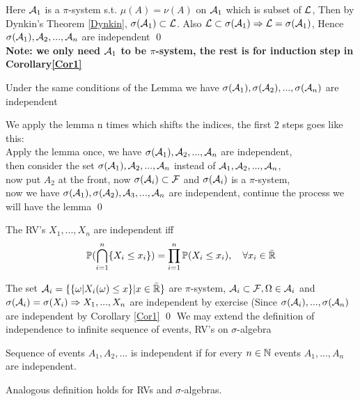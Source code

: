 Here $\mathcal{A}_1$ is a $\pi$-system s.t. $\mu(A) = \nu(A)$ on $\mathcal{A}_1$ which is subset of $\mathcal{L}$, Then by Dynkin's Theorem \ref{Dynkin}, $\sigma(\mathcal{A}_1) \subset \mathcal{L}$. Also $\mathcal{L} \subset \sigma(\mathcal{A}_1) \Rightarrow \mathcal{L} = \sigma(\mathcal{A}_1)$, Hence $\sigma(\mathcal{A}_1), \mathcal{A}_2, ..., \mathcal{A}_n$ are independent \qed \\[0.5cm]
\textbf{Note: we only need $\mathcal{A}_1$ to be $\pi$-system, the rest is for induction step in Corollary\ref{Cor1}}
\newpage
\begin{cor}\label{Cor1}
Under the same conditions of the Lemma we have $\sigma(\mathcal{A}_1), \sigma(\mathcal{A}_2), ..., \sigma(\mathcal{A}_n)$ are independent
\end{cor}
\pf We apply the lemma n times which shifts the indices, the first 2 steps goes like this: \\
Apply the lemma once, we have $\sigma(\mathcal{A}_1), \mathcal{A}_2, ..., \mathcal{A}_n$ are independent, \\
then consider the set $\sigma(\mathcal{A}_1), \mathcal{A}_2, ..., \mathcal{A}_n$ instead of $\mathcal{A}_1, \mathcal{A}_2, ..., \mathcal{A}_n$, \\
now put $A_2$ at the front, now $\sigma(\mathcal{A}_i) \subset \mathcal{F}$ and $\sigma(\mathcal{A}_i)$ is a $\pi$-system, \\
now we have $\sigma(\mathcal{A}_1), \sigma(\mathcal{A}_2), \mathcal{A}_3, ..., \mathcal{A}_n$ are independent, continue the process we will have the lemma \qed
\begin{cor}
The RV's $X_1, ..., X_n$ are independent iff
\begin{equation*}
    \mathbb{P}(\bigcap\limits_{i=1}^n \{X_i \leq x_i\}) = \prod\limits_{i=1}^n \mathbb{P}(X_i \leq x_i), \quad \forall x_i \in \bar{\mathbb{R}}
\end{equation*}
\end{cor}
\pf The set $\mathcal{A}_i = \{\{\omega| X_i(\omega)\leq x\}|x\in \bar{\mathbb{R}}\}$ are $\pi$-system, $\mathcal{A}_i\subset \mathcal{F}, \Omega \in \mathcal{A}_i$ and $\sigma(\mathcal{A}_i) = \sigma(X_i) \Rightarrow X_1,...,X_n$ are independent by exercise (Since $\sigma(\mathcal{A}_i),...,\sigma(\mathcal{A}_n)$ are independent by Corollary \ref{Cor1} \qed 
\newpage
We may extend the definition of independence to infinite sequence of events, RV's on $\sigma$-algebra
\begin{dfn}
Sequence of events $A_1, A_2,...$ is independent if for every $n\in \mathbb{N}$ events $A_1, ..., A_n$ are independent.
\end{dfn}
Analogous definition holds for RVs and $\sigma$-algebras.
